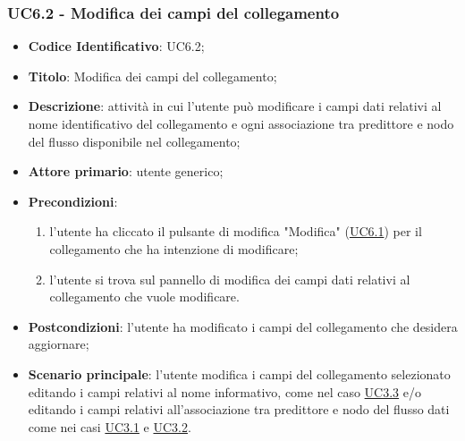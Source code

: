 	\subsubsection{UC6.2 - Modifica dei campi del collegamento}
		\begin{itemize}
			\item\textbf{Codice Identificativo}: UC6.2;
			\item\textbf{Titolo}: Modifica dei campi del collegamento;
			\item\textbf{Descrizione}: attività in cui l'utente può modificare i campi dati relativi al nome identificativo del collegamento e ogni associazione tra predittore e nodo del flusso disponibile nel collegamento;
			\item\textbf{Attore primario}: utente generico;
			\item\textbf{Precondizioni}: 
				\begin{enumerate}
				\item l'utente ha cliccato il pulsante di modifica "Modifica" (\hyperref[par:UC6.1]{UC6.1}) per il collegamento che ha intenzione di modificare;
				\item l'utente si trova sul pannello di modifica dei campi dati relativi al collegamento che vuole modificare.		
		\end{enumerate}							
			\item\textbf{Postcondizioni}: l'utente ha modificato i campi del collegamento che desidera aggiornare; 					
			\item\textbf{Scenario principale}: l'utente modifica i campi del collegamento selezionato editando i campi relativi al nome informativo, come nel caso \hyperref[par:UC3.3]{UC3.3} e/o editando i campi relativi all'associazione tra predittore e nodo del flusso dati come nei casi \hyperref[par:UC3.1]{UC3.1} e \hyperref[par:UC3.2]{UC3.2}.	
		\end{itemize}		
		
	\label{par:UC6.3}
